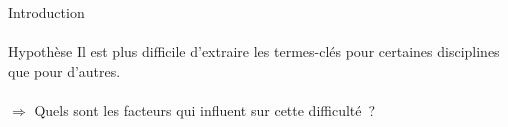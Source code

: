   \begin{frame}{Introduction}
    \framesubtitle{}

    \begin{block}{Hypothèse}
      Il est plus difficile d'extraire les termes-clés pour certaines disciplines
      que pour d'autres.\\~\\
      $\Rightarrow$ Quels sont les facteurs qui influent sur cette difficulté~?
    \end{block}
  \end{frame}

